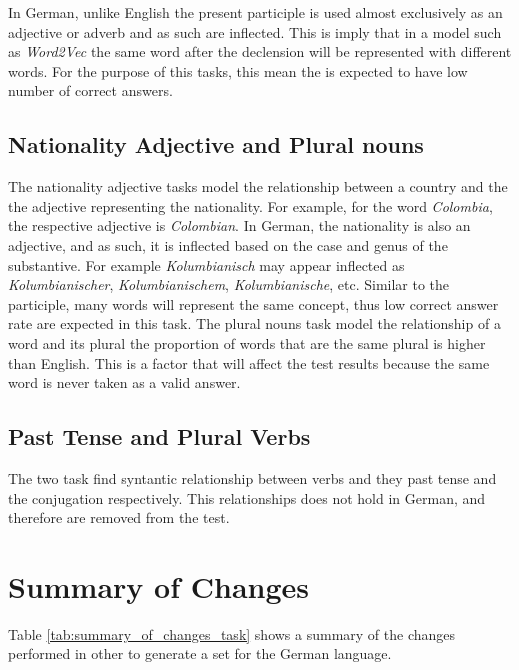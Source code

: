 In German, unlike English  the present participle is used almost exclusively as an
adjective or adverb and as such are inflected. This is imply that in a model
such as  \textit{Word2Vec} the same word after the declension will be
represented with different words. For the purpose of this tasks, this mean
the is expected to have low number of correct answers.

\subsection{Nationality Adjective and  Plural nouns}
\label{sec:sub_sec_nat_plu}

The nationality adjective tasks model the relationship between a country and
the the adjective representing the nationality. For example, for the word
\textit{Colombia}, the respective adjective is \textit{Colombian}. In German,
the nationality is also an adjective, and as such, it  is inflected based on the
case and genus of the substantive.  For example  \textit{Kolumbianisch} may appear 
inflected as \textit{Kolumbianischer},  \textit{Kolumbianischem},
\textit{Kolumbianische}, etc.  Similar to the participle, many words will
represent the same concept, thus low correct answer rate are expected in this
task.  
The plural nouns task model the relationship of a word and its plural the
proportion of words that are the same plural is higher than English. This is
a factor that will affect the test results because the same word is never taken as a
valid answer. 


\subsection{Past Tense and Plural Verbs}
\label{sec:sub_sec_plural_verbs}
The two task find syntantic relationship between verbs and they past tense
and the conjugation respectively. This relationships does not hold in German,
and therefore are removed from the test.

\section{Summary of Changes} 
Table \ref{tab:summary_of_changes_task} shows a summary of the changes
performed in other to generate a set for the German language.

